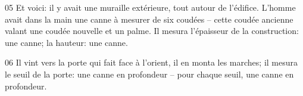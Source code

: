 
05 Et voici: il y avait une muraille extérieure, tout autour de l’édifice. L’homme avait dans la main une canne à mesurer de six coudées – cette coudée ancienne valant une coudée nouvelle et un palme. Il mesura l’épaisseur de la construction: une canne; la hauteur: une canne.

06 Il vint vers la porte qui fait face à l’orient, il en monta les marches; il mesura le seuil de la porte: une canne en profondeur – pour chaque seuil, une canne en profondeur.